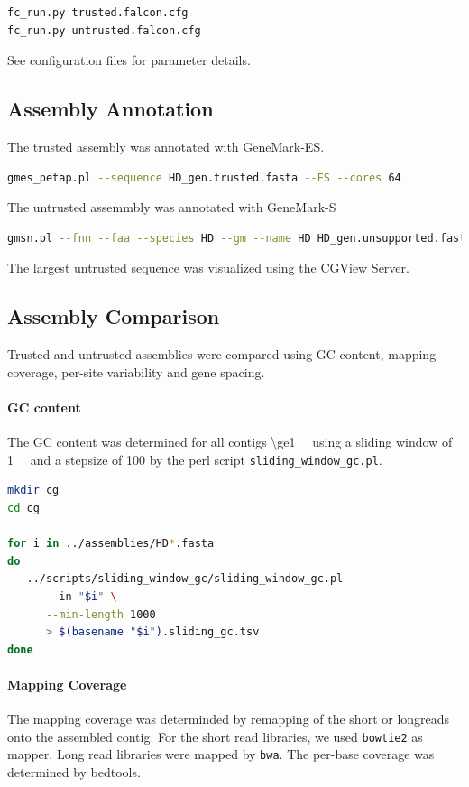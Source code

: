 \documentclass[12pt,a4paper]{scrartcl}
\begin{document}
\begin{lstlisting}[language=bash]
fc_run.py trusted.falcon.cfg
fc_run.py untrusted.falcon.cfg
\end{lstlisting}

See configuration files for parameter details.

\subsection*{Assembly Annotation}
The trusted assembly was annotated with GeneMark-ES.

\begin{lstlisting}[language=bash]
gmes_petap.pl --sequence HD_gen.trusted.fasta --ES --cores 64
\end{lstlisting}

The untrusted assemmbly was annotated with GeneMark-S

\begin{lstlisting}[language=bash]
gmsn.pl --fnn --faa --species HD --gm --name HD HD_gen.unsupported.fasta
\end{lstlisting}

The largest untrusted sequence was visualized using the CGView Server.

\subsection*{Assembly Comparison}

Trusted and untrusted assemblies were compared using GC content, mapping coverage, per-site variability and gene spacing.

\paragraph{GC content}
The GC content was determined for all contigs
\SI{\ge1}{\kilo\basepair} using a sliding window of
\SI{1}{\kilo\basepair} and a stepsize of \SI{100}{\basepair} by the
perl script \texttt{sliding\_window\_gc.pl}.

\begin{lstlisting}[language=bash]
mkdir cg
cd cg

for i in ../assemblies/HD*.fasta
do
   ../scripts/sliding_window_gc/sliding_window_gc.pl
      --in "$i" \
      --min-length 1000
      > $(basename "$i").sliding_gc.tsv
done
\end{lstlisting}

\paragraph{Mapping Coverage}
The mapping coverage was determinded by remapping of the short or
longreads onto the assembled contig. For the short read libraries, we
used \texttt{bowtie2} as mapper. Long read libraries were mapped by
\texttt{bwa}. The per-base coverage was determined by bedtools.
\end{document}
